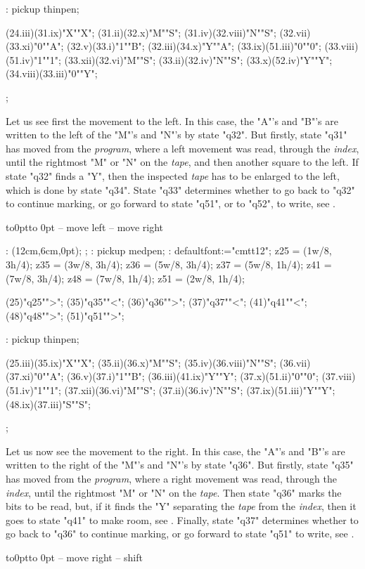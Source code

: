 \MT: pickup thinpen;

\MTinput(24.iii)(31.ix)"X""X";
\MTinput(31.ii)(32.x)"M""S";
\MTinput(31.iv)(32.viii)"N""S";
\MTinput(32.vii)(33.xi)"0""A";
\MTinput(32.v)(33.i)"1""B";
\MTinput(32.iii)(34.x)"Y""A";
\MTinput(33.ix)(51.iii)"0""0";
\MTinput(33.viii)(51.iv)"1""1";
\MTinput(33.xii)(32.vi)"M""S";
\MTinput(33.ii)(32.iv)"N""S";
\MTinput(33.x)(52.iv)"Y""Y";
\MTinput(34.viii)(33.iii)"0""Y";

\MTendfig;


Let us see first the movement to the left.
In this case, the "A"'s and "B"'s are written to the left
of the "M"'s and "N"'s by state "q32".
But firstly, state "q31" has moved from the {\em program},
 where a left movement was read, through the {\em index},
 until the rightmost "M" or "N" on the {\em tape},
 and then another square to the left.
If state "q32" finds a "Y",
then the inspected {\em tape} has to be enlarged to the left,
which is done by state "q34".
State "q33" determines whether to go back to "q32" to continue marking,
or go forward to  state "q51", or to "q52", to write, see .
\par\kern-12pt\vbox to0pt{\kern12pt\hbox to 0pt{\kern4cm\box\MTbox\hss}\vss}
-- move left
-- move right

\MT:
\MTbeginfig(12cm,6cm,0pt);
\MTresetpa;
\MT: pickup medpen;
\MT: defaultfont:="cmtt12";
\MTcode
 z25 = (1w/8, 3h/4);
 z35 = (3w/8, 3h/4);
 z36 = (5w/8, 3h/4);
 z37 = (5w/8, 1h/4);
 z41 = (7w/8, 3h/4);
 z48 = (7w/8, 1h/4);
 z51 = (2w/8, 1h/4);

\MTstate(25)"q25"">";
\MTstate(35)"q35""<";
\MTstate(36)"q36"">";
\MTstate(37)"q37""<";
\MTstate(41)"q41""<";
\MTstate(48)"q48"">";
\MTstate(51)"q51"">";

\MT: pickup thinpen;

\MTinput(25.iii)(35.ix)"X""X";
\MTinput(35.ii)(36.x)"M""S";
\MTinput(35.iv)(36.viii)"N""S";
\MTinput(36.vii)(37.xi)"0""A";
\MTinput(36.v)(37.i)"1""B";
\MTinput(36.iii)(41.ix)"Y""Y";
\MTinput(37.x)(51.ii)"0""0";
\MTinput(37.viii)(51.iv)"1""1";
\MTinput(37.xii)(36.vi)"M""S";
\MTinput(37.ii)(36.iv)"N""S";
\MTinput(37.ix)(51.iii)"Y""Y";
\MTinput(48.ix)(37.iii)"S""S";

\MTendfig;

Let us now see the movement to the right.
In this case, the "A"'s and "B"'s are written to the right
of the "M"'s and "N"'s by state "q36".
But firstly, state "q35" has moved from the {\em program},
 where a right movement was read,
through the {\em index}, until the rightmost "M" or "N" on the {\em tape}.
Then state "q36" marks the bits to be read,
but, if it finds the "Y" separating the {\em tape} from the {\em index},
then it goes to state "q41" to make room, see .
Finally, state "q37" determines whether to go back to "q36"
to continue marking,
or go forward to state "q51" to write, see .
\par\kern-12pt\vbox to0pt{\kern6pt\hbox to 0pt{\kern4cm\box\MTbox\hss}\vss}
-- move right
-- shift

